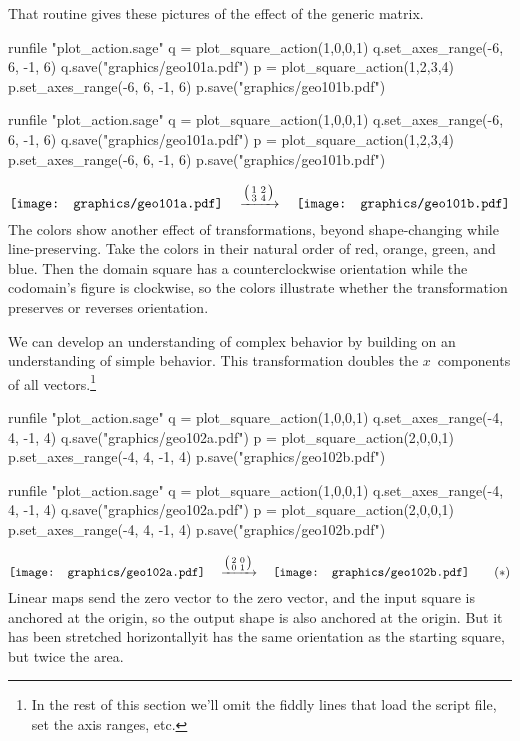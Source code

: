 That routine gives
these pictures of the effect of the generic matrix.
\begin{sageoutput}
runfile "plot_action.sage"
q = plot_square_action(1,0,0,1) 
q.set_axes_range(-6, 6, -1, 6) 
q.save("graphics/geo101a.pdf")
p = plot_square_action(1,2,3,4) 
p.set_axes_range(-6, 6, -1, 6) 
p.save("graphics/geo101b.pdf")
\end{sageoutput}
\begin{sagesilent}
runfile "plot_action.sage"
q = plot_square_action(1,0,0,1) 
q.set_axes_range(-6, 6, -1, 6) 
q.save("graphics/geo101a.pdf")
p = plot_square_action(1,2,3,4) 
p.set_axes_range(-6, 6, -1, 6) 
p.save("graphics/geo101b.pdf")
\end{sagesilent}
\begin{equation*}
  \vcenteredhbox{\texttt{[image: graphics/geo101a.pdf]}}
  \quad\mapsvia{\big (\begin{smallmatrix} 1 &2 \\ 3 &4 \end{smallmatrix}\big )}\quad
  \vcenteredhbox{\texttt{[image: graphics/geo101b.pdf]}}
\end{equation*}
The colors show another effect of transformations, beyond shape-changing
while line-preserving.
Take the colors in their natural order of red, orange, 
green, and blue.
Then the domain square has a counterclockwise orientation while the codomain's
figure is clockwise, so the colors illustrate whether the transformation 
preserves or reverses orientation.

We can develop an understanding of complex behavior by 
building on an understanding of simple behavior.
This transformation doubles the $x$~components of all 
vectors.\footnote{In the rest of this section we'll omit the fiddly
lines that load the script file, set the axis ranges, etc.} 
\begin{sageoutput}[d,0,4;d,5,7]
runfile "plot_action.sage"
q = plot_square_action(1,0,0,1) 
q.set_axes_range(-4, 4, -1, 4) 
q.save("graphics/geo102a.pdf")
p = plot_square_action(2,0,0,1)  
p.set_axes_range(-4, 4, -1, 4) 
p.save("graphics/geo102b.pdf")
\end{sageoutput}
\begin{sagesilent}
runfile "plot_action.sage"
q = plot_square_action(1,0,0,1) 
q.set_axes_range(-4, 4, -1, 4) 
q.save("graphics/geo102a.pdf")
p = plot_square_action(2,0,0,1)  
p.set_axes_range(-4, 4, -1, 4) 
p.save("graphics/geo102b.pdf")
\end{sagesilent}
\begin{equation*}
  \vcenteredhbox{\texttt{[image: graphics/geo102a.pdf]}}
  \quad\mapsvia{\big (\begin{smallmatrix} 2 &0 \\ 0 &1 \end{smallmatrix}\big )}\quad
  \vcenteredhbox{\texttt{[image: graphics/geo102b.pdf]}}
  \tag{$*$}
\end{equation*}
\noindent
Linear maps send the zero vector to the zero vector, and the input
square is anchored at the origin, so 
the output shape is also anchored at the origin.
But it has been stretched horizontally\Dash it has the same orientation
as the starting square, but twice the area.

